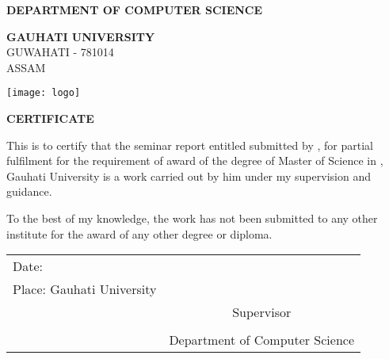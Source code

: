 \cleardoublepage
\thispagestyle{empty}

\begin{center}
 \textbf{\large DEPARTMENT OF COMPUTER SCIENCE}

  \vspace{0.2cm}
 \textbf{\LARGE GAUHATI UNIVERSITY}\\
 {\large GUWAHATI - 781014}\\
 {\large ASSAM}

 \vspace{1cm}

 \texttt{[image: logo]}

 \vspace{2cm}

 \textbf{\large CERTIFICATE}

 \vspace{2cm}

\end{center}

This is to certify that the seminar report entitled \textbf{\thesistitle} submitted by \textbf{\name}, for partial fulfilment for the requirement of award of the degree of Master of Science in \textbf{\degree}, Gauhati University is a work carried out by him under my supervision and guidance.

To the best of my knowledge, the work has not been submitted to any other institute for the award of any other degree or diploma.

 \vspace{3cm}

\begin{tabular}{p{8cm} c}
Date:	 \submissiondate &	\\
Place: Gauhati University	&\supervisor \\
	&	Supervisor\\
	&	\supervisordesignation\\
	&	Department of Computer Science\\
\end{tabular}

